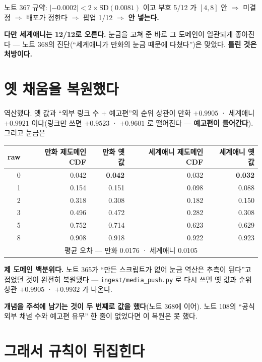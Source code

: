 \documentclass[11pt]{article}
\begin{document}
노트 367 규약: $|-0.0002| < 2{\times}$SD$(0.0081)$ 이고 부호 5/12 가
$[4,8]$ 안 $\Rightarrow$ 미결정 $\Rightarrow$ 배포가 정한다 $\Rightarrow$
팝업 1/12 $\Rightarrow$ \textbf{안 넣는다.}

\textbf{다만 세계애니는 12/12로 오른다.} 눈금을 고쳐 준 바로 그 도메인이
일관되게 좋아진다 --- 노트 368의 진단(``세계애니가 만화의 눈금 때문에
다쳤다'')은 맞았다. \textbf{틀린 것은 처방이다.}

\section{옛 채움을 복원했다}

역산했다. 옛 값과 ``외부 링크 수 $+$ 예고편''의 순위 상관이 만화
$+0.9905$ · 세계애니 $+0.9921$ 이다(링크만 쓰면 $+0.9523$ · $+0.9601$ 로
떨어진다 --- \textbf{예고편이 들어간다}). 그리고 눈금은

\begin{center}
\begin{tabular}{rrrrr}
\hline
raw & 만화 제도메인CDF & 만화 옛 값 & 세계애니 제도메인CDF & 세계애니 옛 값 \\
\hline
0 & 0.042 & \textbf{0.042} & 0.032 & \textbf{0.032} \\
1 & 0.154 & 0.151 & 0.098 & 0.088 \\
2 & 0.318 & 0.308 & 0.182 & 0.150 \\
3 & 0.496 & 0.472 & 0.282 & 0.308 \\
5 & 0.752 & 0.714 & 0.623 & 0.629 \\
8 & 0.908 & 0.918 & 0.922 & 0.923 \\
\hline
\multicolumn{5}{c}{평균 오차 --- 만화 0.0176 · 세계애니 0.0105} \\
\hline
\end{tabular}
\end{center}

\textbf{제 도메인 백분위다.} 노트 365가 ``만든 스크립트가 없어 눈금
역산은 추측이 된다''고 접었던 것이 완전히 복원됐다 ---
\texttt{ingest/media\_push.py} 로 다시 쓰면 옛 값과 순위 상관 $+0.9905$ ·
$+0.9932$ 가 나온다.

\textbf{개념을 주석에 남기는 것이 두 번째로 값을 했다}(노트 368에 이어).
노트 108의 ``공식 외부 채널 수와 예고편 유무'' 한 줄이 없었다면 이
복원은 못 했다.

\section{그래서 규칙이 뒤집힌다}
\end{document}
